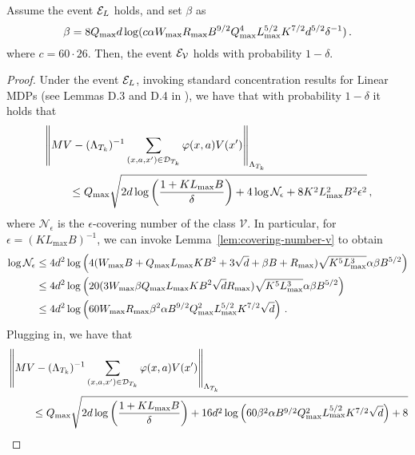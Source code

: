 \begin{lemma} \label{lem:uniform-event-holds}
    Assume the event $\mathcal{E}_L$ holds, and set $\beta$ as
    \begin{equation*}
        \beta = 8 Q_{\max} d \log(c \alpha W_{\max} R_{\max} B^{9/2} Q^4_{\max}L^{5/2}_{\max}K^{7/2} d^{5/2} \delta^{-1})\,.
    \end{equation*}
    where $c = 60 \cdot 26$. Then, the event $\mathcal{E}_{\mathcal{V}}$ holds with probability $1 - \delta$.
\end{lemma}

\begin{proof}
    Under the event $\mathcal{E}_L$, invoking standard concentration results for Linear MDPs (see Lemmas D.3 and D.4 in \cite{jin2019provably}), we have that with probability $1-\delta$ it holds that
    \begin{align*}
        &\left\|MV - (\Lambda_{T_k})^{-1}\sum_{(x,a,x')\in \mathcal{D}_{T_k}} \varphi(x,a) V(x')\right\|_{\Lambda_{T_k}} \\ &~~~~~~~\leq Q_{\max} \sqrt{2 d \log\left({\frac{1 + K L_{\max}B}{\delta}}\right) + 4 \log \mathcal{N}_\epsilon + 8 K^2 L^2_{\max}B^2 \epsilon^2}\,,
    \end{align*}
    where $\mathcal{N}_\epsilon$ is the $\epsilon $-covering number of the class $\mathcal{V}$. In particular, for $\epsilon = (K L_{\max} B)^{-1}$, we can invoke Lemma~\ref{lem:covering-number-v} to obtain
    \begin{align*}
        \log \mathcal{N}_{\epsilon} &\leq 4d^2 \log \left({4(W_{\max} B + Q_{\max}L_{\max}K B^2 + 3\sqrt{d}+ \beta B +R_{\max})\sqrt{K^5L^3_{\max}}\alpha\beta B^{5/2}}\right) \\
        &\leq 4d^2 \log \left({20(3 W_{\max} \beta Q_{\max}L_{\max}KB^2\sqrt{d}R_{\max})\sqrt{K^5L^3_{\max}}\alpha\beta B^{5/2}}\right) \\
        &\leq 4d^2 \log \left({60 W_{\max} R_{\max} \beta^2 \alpha B^{9/2} Q^2_{\max}L^{5/2}_{\max}K^{7/2}\sqrt{d}}\right)\,.
    \end{align*}
    Plugging in, we have that
    \begin{align*}
        &\norm{MV - (\Lambda_{T_k})^{-1}\sum_{(x,a,x')\in \mathcal{D}_{T_k}} \phi(x,a) V(x')}_{\Lambda_{T_k}} \\ 
        &~~~~~~~\leq Q_{\max} \sqrt{2 d \log\brr{\frac{1 + K L_{\max} B}{\delta}} + 16 d^2 \log \brr{60 \beta^2 \alpha B^{9/2}Q^2_{\max}L^{5/2}_{\max}K^{7/2}\sqrt{d}} + 8} \\

\end{align*}
\end{proof}

